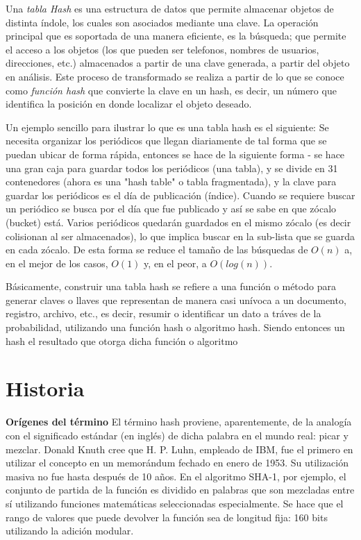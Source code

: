 \documentclass[letterpaper,openright,12pt]{report}
\begin{document}
Una \emph{tabla Hash} es una estructura de datos que permite almacenar objetos de distinta índole, los cuales son asociados mediante una clave. La operación principal que es soportada de una manera eficiente, es la búsqueda; que permite el acceso a los objetos (los que pueden ser telefonos, nombres de usuarios, direcciones, etc.) almacenados a partir de una clave generada, a partir del objeto en análisis. Este proceso de transformado se realiza a partir de lo que se conoce como \emph{función hash} que convierte la clave en un hash, es decir, un número que identifica la posición en donde localizar el objeto deseado.

Un ejemplo sencillo para ilustrar lo que es una tabla hash es el siguiente: Se necesita organizar los periódicos que llegan diariamente de tal forma que se puedan ubicar de forma rápida, entonces se hace de la siguiente forma - se hace una gran caja para guardar todos los periódicos (una tabla), y se divide en 31 contenedores (ahora es una "hash table" o tabla fragmentada), y la clave para guardar los periódicos es el día de publicación (índice). Cuando se requiere buscar un periódico se busca por el día que fue publicado y así se sabe en que zócalo (bucket) está. Varios periódicos quedarán guardados en el mismo zócalo (es decir colisionan al ser almacenados), lo que implica buscar en la sub-lista que se guarda en cada zócalo. De esta forma se reduce el tamaño de las búsquedas de $O(n)$ a, en el mejor de los casos, $O(1)$ y, en el peor, a $O(log(n))$.

Básicamente, construir una tabla hash se refiere a una función o método para generar claves o llaves que representan de manera casi unívoca a un documento, registro, archivo, etc., es decir, resumir o identificar un dato a tráves de la probabilidad, utilizando una función hash o algoritmo hash. Siendo entonces un hash el resultado que otorga dicha función o algoritmo%

\newpage
\section{Historia}

\textbf{Orígenes del término} El término hash proviene, aparentemente,
de la analogía con el significado estándar (en inglés) de dicha palabra
en el mundo real: picar y mezclar. Donald Knuth cree que H. P. Luhn,
empleado de IBM, fue el primero en utilizar el concepto en un memorándum
fechado en enero de 1953. Su utilización masiva no fue hasta después de
10 años. En el algoritmo SHA-1, por ejemplo, el conjunto de partida de
la función es dividido en palabras que son mezcladas entre sí utilizando
funciones matemáticas seleccionadas especialmente. Se hace que el rango
de valores que puede devolver la función sea de longitud fija: 160 bits
utilizando la adición modular.
\newpage
\end{document}
